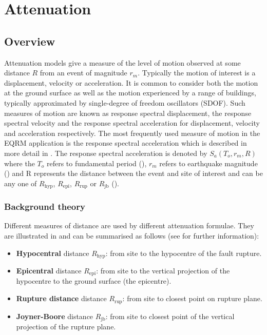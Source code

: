 \chapter{Attenuation}
\label{ch:atten}
\newcommand{\Rhyp}{R_{\mathrm{hyp}}}
\newcommand{\Repi}{R_{\mathrm{epi}}}
\newcommand{\Rrup}{R_{\mathrm{rup}}}
\newcommand{\Rjb}{R_{\mathrm{jb}}}

\section{Overview}

Attenuation models give a measure of the level of motion observed
at some distance $R$ from an event of magnitude $r_m$. Typically
the motion of interest is a displacement, velocity or
acceleration. It is common to consider both the motion at the
ground surface as well as the motion experienced by a range of
buildings, typically approximated by single-degree of freedom
oscillators (SDOF). Such measures of motion are known as response
spectral displacement, the
response spectral velocity and
the response spectral acceleration for displacement, velocity and acceleration
respectively. The most frequently used measure of motion in the
EQRM application is the response spectral
acceleration which is
described in more detail in . The response spectral
acceleration is denoted by $S_a(T_o,r_m,R)$ where the $T_o$ refers
to fundamental period (), $r_m$ refers to earthquake
magnitude () and R represents the
distance between the event and site of interest and can be any one
of $\Rhyp$, $\Repi$, $\Rrup$ or $\Rjb$ ().

\subsection{Background theory}
\label{sec:attn-dist}


Different measures of distance are used by different attenuation
formulae. They are illustrated in  and
can be summarised as follows (see \citet*{dr_Abrahamson97a} for
further information):

\begin{itemize}
\item {\bfseries Hypocentral} distance $\Rhyp$: from site to the hypocentre of
  the fault rupture.
\item {\bfseries Epicentral} distance $\Repi$: from site to the
vertical projection of
  the hypocentre to the ground surface (the epicentre).
\item {\bfseries Rupture distance} distance $\Rrup$: from site to closest
  point on rupture plane.
\item {\bfseries Joyner-Boore} distance $\Rjb$: from site to
closest point of the vertical projection of the rupture plane.
\end{itemize}


